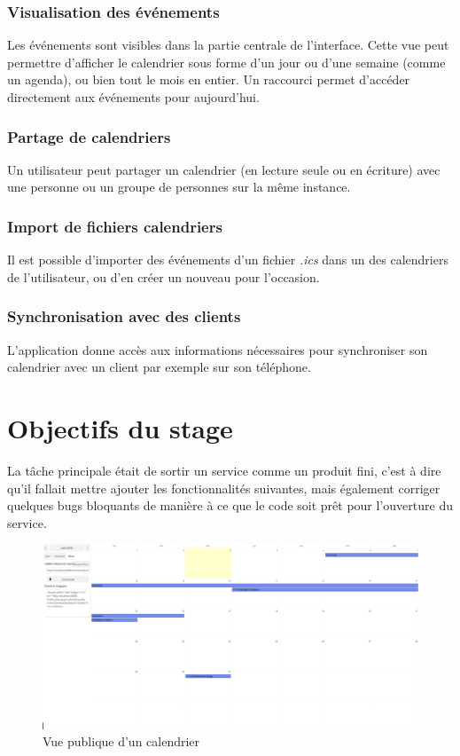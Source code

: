 \documentclass[10pt,a4paper, twoside]{report}
\begin{document}
	\subsubsection{Visualisation des événements}
	Les événements sont visibles dans la partie centrale de l'interface. Cette vue peut permettre d'afficher le calendrier sous forme d'un jour ou d'une semaine (comme un agenda), ou bien tout le mois en entier. Un raccourci permet d'accéder directement aux événements pour aujourd’hui.
	
	\subsubsection{Partage de calendriers}
	Un utilisateur peut partager un calendrier (en lecture seule ou en écriture) avec une personne ou un groupe de personnes sur la même instance.
	
	\subsubsection{Import de fichiers calendriers}
	Il est possible d'importer des événements d'un fichier \textit{.ics} dans un des calendriers de l'utilisateur, ou d'en créer un nouveau pour l'occasion.
	
	\subsubsection{Synchronisation avec des clients}
	L'application donne accès aux informations nécessaires pour synchroniser son calendrier avec un client par exemple sur son téléphone.
	
	\section{Objectifs du stage}
	
	La tâche principale était de sortir un service comme un produit fini, c'est à dire qu'il fallait mettre ajouter les fonctionnalités suivantes, mais également corriger quelques bugs bloquants de manière à ce que le code soit prêt pour l'ouverture du service.
	
	\begin{figure}[ht]
		\centering
		\centerline{\includegraphics[width=1.5\textwidth]{images/calendrier-vue-publique.png}}
		\caption*{Vue publique d'un calendrier}
		\label{normal_case}
	\end{figure}
	
\end{document}
